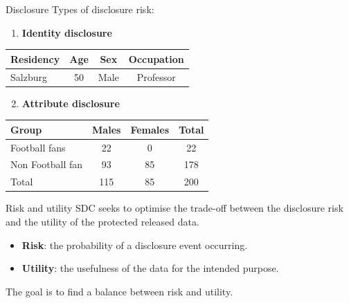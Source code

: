 \documentclass[
	11pt, %
]{beamer}
\begin{document}
\begin{frame}{Disclosure}
\label{disclosure-1}
Types of disclosure risk:

\begin{enumerate}
[(1)]
\tightlist
\item
  \textbf{Identity disclosure}
\end{enumerate}

\vspace{-2em}
\begin{table}[ht] 
\centering
\begin{tabular}[t]{lccc}
\toprule
Residency&Age&Sex&Occupation\\
\midrule
Salzburg&50&Male&Professor\\
\bottomrule
\end{tabular}
\end{table}

\begin{enumerate}
[(1)]
\setcounter{enumi}{1}
\tightlist
\item
  \textbf{Attribute disclosure}
\end{enumerate}

\vspace{-2em}
\begin{table}[ht]
\centering
\begin{tabular}[t]{lccc}
\toprule
Group&Males&Females&Total\\
\midrule
Football fans&22&0&22\\
Non Football fan&93&85&178\\
Total&115&85&200\\
\bottomrule
\end{tabular}
\end{table}
\end{frame}

\begin{frame}{Risk and utility}
\label{risk-and-utility}
SDC seeks to optimise the trade-off between the disclosure risk and the
utility of the protected released data.

\begin{itemize}
\item
  \textbf{Risk}: the probability of a disclosure event occurring.
\item
  \textbf{Utility}: the usefulness of the data for the intended purpose.
\end{itemize}

The goal is to find a balance between risk and utility.
\end{frame}
\end{document}
